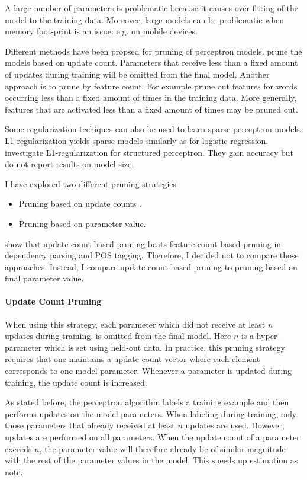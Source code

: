 A large number of parameters is problematic because it causes
over-fitting of the model to the training data. Moreover, large models
can be problematic when memory foot-print is an issue: e.g. on mobile
devices.

Different methods have been propsed for pruning of perceptron
models. \cite{Goldberg2011} prune the models based on update
count. Parameters that receive less than a fixed amount of updates
during training will be omitted from the final model. Another approach
is to prune by feature count. For example \cite{Hulden2013} prune
out features for words occurring less than a fixed amount of times in
the training data. More generally, features that are activated less than
a fixed amount of times may be pruned out. 

Some regularization techiques can also be used to learn sparse
perceptron models. L1-regularization yields sparse models similarly as
for logistic regression. \cite{Zhang2014} investigate
L1-regularization for structured perceptron. They gain accuracy but do
not report results on model size.

I have explored two different pruning strategies
\begin{itemize}
\item Pruning based on update counts \citep{Goldberg2011}.
\item Pruning based on parameter value.
\end{itemize}
\cite{Goldberg2011} show that update count based pruning beats feature
count based pruning in dependency parsing and POS tagging. Therefore,
I decided not to compare those approaches. Instead, I compare update
count based pruning to pruning based on final parameter value.

\paragraph{Update Count Pruning} When using this strategy, each
parameter which did not receive at least $n$ updates during training,
is omitted from the final model. Here $n$ is a hyper-parameter which
is set using held-out data. In practice, this pruning strategy
requires that one maintains a update count vector where each element
corresponds to one model parameter. Whenever a parameter is updated
during training, the update count is increased.

As stated before, the perceptron algorithm labels a training example
and then performs updates on the model parameters. When labeling
during training, only those parameters that already received at least
$n$ updates are used. However, updates are performed on all
parameters. When the update count of a parameter exceeds $n$, the
parameter value will therefore already be of similar magnitude with
the rest of the parameter values in the model. This speeds up
estimation as \cite{Goldberg2011} note.

